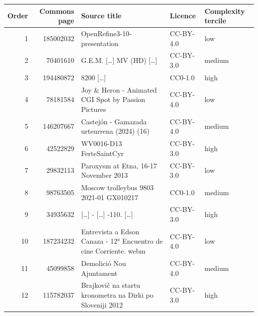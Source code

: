 \begin{tabular}{rrlll}
\toprule
Order & Commons page & Source title & Licence & Complexity tercile \\
\midrule
1 & 185002032 & OpenRefine3-10-presentation & CC-BY-4.0 & low \\
2 & 70401610 & G.E.M. [\ldots] MV (HD) [\ldots] & CC-BY-3.0 & medium \\
3 & 194480872 & 8200 [\ldots] & CC0-1.0 & high \\
4 & 78181584 & Joy \& Heron - Animated CGI Spot by Passion Pictures & CC-BY-4.0 & low \\
5 & 146207667 & Castejón - Gamazada urteurrena (2024) (16) & CC-BY-4.0 & medium \\
6 & 42522829 & WV0016-D13 FerteSaintCyr & CC-BY-3.0 & high \\
7 & 29832113 & Paroxysm at Etna, 16-17 November 2013 & CC-BY-3.0 & low \\
8 & 98763505 & Moscow trolleybus 9803 2021-01 GX010217 & CC0-1.0 & medium \\
9 & 34935632 & [\ldots] - [\ldots] -110. [\ldots] & CC-BY-3.0 & high \\
10 & 187234232 & Entrevista a Edson Canaza - 12° Encuentro de cine Corriente. webm & CC-BY-4.0 & low \\
11 & 45099858 & Demolició Nou Ajuntament & CC-BY-4.0 & medium \\
12 & 115782037 & Brajkovič na startu kronometra na Dirki po Sloveniji 2012 & CC-BY-3.0 & high \\
\bottomrule
\end{tabular}
